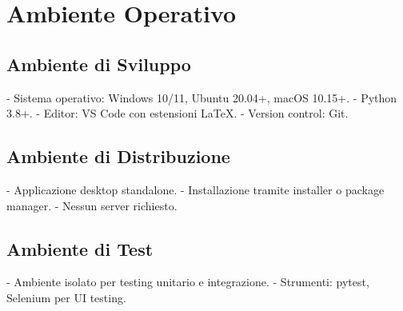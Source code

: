\section{Ambiente Operativo}

\subsection{Ambiente di Sviluppo}

- Sistema operativo: Windows 10/11, Ubuntu 20.04+, macOS 10.15+.
- Python 3.8+.
- Editor: VS Code con estensioni LaTeX.
- Version control: Git.

\subsection{Ambiente di Distribuzione}

- Applicazione desktop standalone.
- Installazione tramite installer o package manager.
- Nessun server richiesto.

\subsection{Ambiente di Test}

- Ambiente isolato per testing unitario e integrazione.
- Strumenti: pytest, Selenium per UI testing.